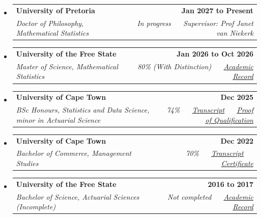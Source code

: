 \documentclass[letterpaper,11pt]{article}
\makeatletter
\newcommand{\resumeSubheading}[4]{
  \vspace{-2pt}\item
    \begin{tabular*}{1.0\textwidth}[t]{l@{\extracolsep{\fill}}r}
      \textbf{\large#1} & \textbf{\small #2} \\
      \textit{\large#3} & \textit{\small #4} \\

    \end{tabular*}\vspace{-7pt}
}
\newcommand{\resumeSubHeadingListStart}{\begin{itemize}[leftmargin=0.0in, label={}]}
\newcommand{\resumeSubHeadingListEnd}{\end{itemize}}
\makeatother
\begin{document}
\resumeSubHeadingListStart
    \resumeSubheading
      {University of Pretoria}{Jan 2027 to Present}
      {Doctor of Philosophy, Mathematical Statistics}{In progress ~\textbar~ Supervisor: Prof Janet van Niekerk}
    \vspace{5pt}
    \resumeSubheading
      {University of the Free State}{Jan 2026 to Oct 2026}
      {Master of Science, Mathematical Statistics}{80\% (With Distinction) ~\textbar~ \href{https://github.com/thabangTheActuaryCoder/Academic-Records/blob/master/UV_ACADREC_S\%20\%28Baloyi\%20Thabang\%20MSc\%29.pdf}{\color{blue}\underline{Academic Record}}}
    \vspace{5pt}
    \resumeSubheading
      {University of Cape Town}{Dec 2025}
      {BSc Honours, Statistics and Data Science, minor in Actuarial Science}{74\% ~\textbar~ \href{https://github.com/thabangTheActuaryCoder/Academic-Records/blob/master/UCT\%20TRANSCRIPT\%202025.pdf}{\color{blue}\underline{Transcript}} ~\textbar~ \href{https://github.com/thabangTheActuaryCoder/Academic-Records/blob/master/Proof\%20of\%20Qualification\%20-\%20BSc.\%20Hons\%20Statistics\%20and\%20Data\%20Sciences.pdf}{\color{blue}\underline{Proof of Qualification}}}
    \vspace{5pt}
    \resumeSubheading
      {University of Cape Town}{Dec 2022}
      {Bachelor of Commerce, Management Studies}{70\% ~\textbar~ \href{https://github.com/thabangTheActuaryCoder/Academic-Records/blob/master/UCT\%20TRANSCRIPT\%202025.pdf}{\color{blue}\underline{Transcript}} ~\textbar~ \href{https://github.com/thabangTheActuaryCoder/Academic-Records/blob/master/UCT\%20CERTIFICATE.pdf}{\color{blue}\underline{Certificate}}}
    \vspace{5pt}
    \resumeSubheading
      {University of the Free State}{2016 to 2017}
      {Bachelor of Science, Actuarial Sciences \textup{(Incomplete)}}{Not completed ~\textbar~ \href{https://github.com/thabangTheActuaryCoder/Academic-Records/blob/master/UV\_ACADREC\_S\%202026.pdf}{\color{blue}\underline{Academic Record}}}
\resumeSubHeadingListEnd
\vspace{-2pt}

\end{document}
